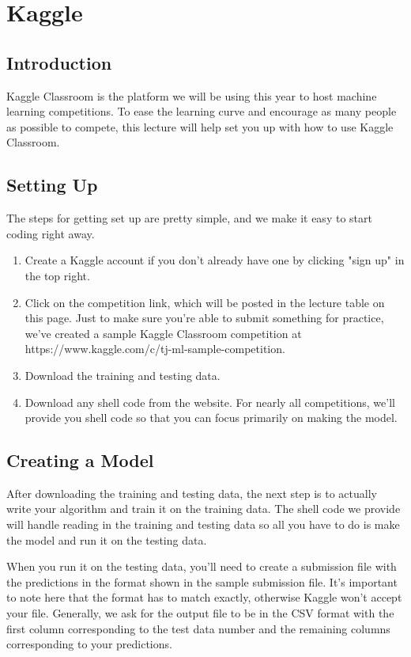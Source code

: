 \documentclass{article}
\begin{document}
\section{Kaggle}

\subsection{Introduction}
Kaggle Classroom is the platform we will be using this year to host machine learning competitions. To ease the learning curve and encourage as many people as possible to compete, this lecture will help set you up with how to use Kaggle Classroom.

\subsection{Setting Up}

The steps for getting set up are pretty simple, and we make it easy to start coding right away.

\begin{enumerate}
    \item Create a Kaggle account if you don't already have one by clicking "sign up" in the top right.
    \item Click on the competition link, which will be posted in the lecture table on this page. Just to make sure you're able to submit something for practice, we've created a sample Kaggle Classroom competition at https://www.kaggle.com/c/tj-ml-sample-competition.
    \item Download the training and testing data.
    \item Download any shell code from the website. For nearly all competitions, we'll provide you shell code so that you can focus primarily on making the model.
\end{enumerate}

\subsection{Creating a Model}

After downloading the training and testing data, the next step is to actually write your algorithm and train it on the training data. The shell code we provide will handle reading in the training and testing data so all you have to do is make the model and run it on the testing data.

When you run it on the testing data, you'll need to create a submission file with the predictions in the format shown in the sample submission file. It's important to note here that the format has to match exactly, otherwise Kaggle won't accept your file. Generally, we ask for the output file to be in the CSV format with the first column corresponding to the test data number and the remaining columns corresponding to your predictions.
\end{document}
